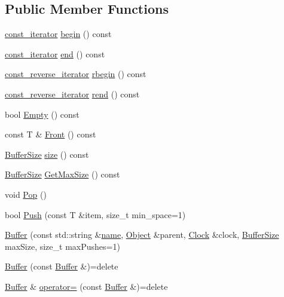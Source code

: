\subsection*{Public Member Functions}
\begin{DoxyCompactItemize}
\item 
\hyperlink{class_simulator_1_1_buffer_a50ac4b556b0c93ce985359e10472923b}{const\+\_\+iterator} \hyperlink{class_simulator_1_1_buffer_ac2aa81120a60881adba4f5fb14b10681}{begin} () const 
\item 
\hyperlink{class_simulator_1_1_buffer_a50ac4b556b0c93ce985359e10472923b}{const\+\_\+iterator} \hyperlink{class_simulator_1_1_buffer_a15a1da6eca670910cbc99cd600dc9e7c}{end} () const 
\item 
\hyperlink{class_simulator_1_1_buffer_aed79765ab3f5ebbcf7399c9402634607}{const\+\_\+reverse\+\_\+iterator} \hyperlink{class_simulator_1_1_buffer_a0db82a924cbe771050a7a6ea9799450b}{rbegin} () const 
\item 
\hyperlink{class_simulator_1_1_buffer_aed79765ab3f5ebbcf7399c9402634607}{const\+\_\+reverse\+\_\+iterator} \hyperlink{class_simulator_1_1_buffer_ac27e86090b6412a1c8b061ead8d4c968}{rend} () const 
\item 
bool \hyperlink{class_simulator_1_1_buffer_a28d7761486184657ba108eeae25a6978}{Empty} () const 
\item 
const T \& \hyperlink{class_simulator_1_1_buffer_a5ad63aa8daa373a4a8fb2529f4127d8f}{Front} () const 
\item 
\hyperlink{namespace_simulator_a5ca279f926485be2d0554e41275a3305}{Buffer\+Size} \hyperlink{class_simulator_1_1_buffer_aa78d6091099540dfb846792c51926a56}{size} () const 
\item 
\hyperlink{namespace_simulator_a5ca279f926485be2d0554e41275a3305}{Buffer\+Size} \hyperlink{class_simulator_1_1_buffer_a7253d468055a0db9bc21e9e1d50a65fd}{Get\+Max\+Size} () const 
\item 
void \hyperlink{class_simulator_1_1_buffer_a1640dbaf585259908e88f0251624aeb2}{Pop} ()
\item 
bool \hyperlink{class_simulator_1_1_buffer_aad6a44e805c7d98d58f6afc35541597a}{Push} (const T \&item, size\+\_\+t min\+\_\+space=1)
\item 
\hyperlink{class_simulator_1_1_buffer_a346bb39cdb62dd787d873a648ae18308}{Buffer} (const std\+::string \&\hyperlink{mtconf_8c_a8f8f80d37794cde9472343e4487ba3eb}{name}, \hyperlink{class_simulator_1_1_object}{Object} \&parent, \hyperlink{class_simulator_1_1_clock}{Clock} \&clock, \hyperlink{namespace_simulator_a5ca279f926485be2d0554e41275a3305}{Buffer\+Size} max\+Size, size\+\_\+t max\+Pushes=1)
\item 
\hyperlink{class_simulator_1_1_buffer_a53a13bf07063fd1c691e954fe376f3e4}{Buffer} (const \hyperlink{class_simulator_1_1_buffer}{Buffer} \&)=delete
\item 
\hyperlink{class_simulator_1_1_buffer}{Buffer} \& \hyperlink{class_simulator_1_1_buffer_a7c175139708831d820077c6f9804a91b}{operator=} (const \hyperlink{class_simulator_1_1_buffer}{Buffer} \&)=delete
\end{DoxyCompactItemize}
